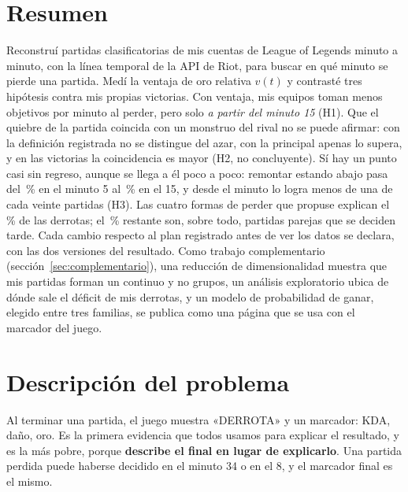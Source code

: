 \documentclass[11pt,letterpaper]{article}
\begin{document}
\tableofcontents
\newpage

\section*{Resumen}

Reconstruí \nFinal{} partidas clasificatorias de mis \nCuentas{} cuentas de League of
Legends minuto a minuto, con la línea temporal de la API de Riot, para buscar en qué
minuto se pierde una partida. Medí la ventaja de oro relativa \(v(t)\) y contrasté tres
hipótesis contra mis propias victorias. Con ventaja, mis equipos toman menos objetivos
por minuto al perder, pero solo \emph{a partir del minuto 15} (H1). Que el quiebre de
la partida coincida con un monstruo del rival no se puede afirmar: con la definición
registrada no se distingue del azar, con la principal apenas lo supera, y en las
victorias la coincidencia es mayor (H2, no concluyente). Sí hay un punto casi sin
regreso, aunque se llega a él poco a poco: remontar estando abajo pasa del
\hTresCinco\,\% en el minuto 5 al \hTresQuince\,\% en el 15, y desde el minuto
\hTresPunto{} lo logra menos de una de cada veinte partidas (H3). Las cuatro formas de
perder que propuse explican el \pctClas\,\% de las derrotas; el \pctSinClas\,\% restante
son, sobre todo, partidas parejas que se deciden tarde. Cada cambio respecto al plan
registrado antes de ver los datos se declara, con las dos versiones del resultado. Como
trabajo complementario (sección~\ref{sec:complementario}), una reducción de dimensionalidad
muestra que mis partidas forman un continuo y no grupos, un análisis exploratorio ubica de
dónde sale el déficit de mis derrotas, y un modelo de probabilidad de ganar, elegido entre
tres familias, se publica como una página que se usa con el marcador del juego.

\section{Descripción del problema}

Al terminar una partida, el juego muestra «DERROTA» y un marcador: KDA, daño, oro. Es
la primera evidencia que todos usamos para explicar el resultado, y es la más pobre,
porque \textbf{describe el final en lugar de explicarlo}. Una partida perdida puede
haberse decidido en el minuto 34 o en el 8, y el marcador final es el mismo.
\end{document}
